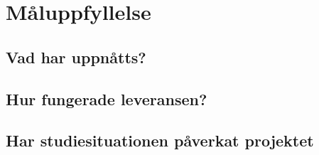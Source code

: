
\section{Måluppfyllelse}

\subsection{Vad har uppnåtts?}

\subsection{Hur fungerade leveransen?}

\subsection{Har studiesituationen påverkat projektet}
